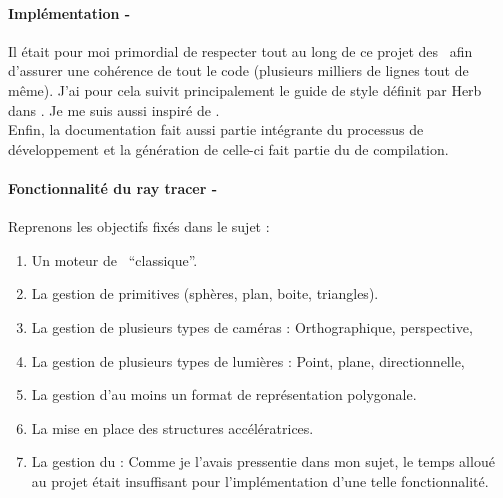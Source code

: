 \vspace*{1em}

\paragraph{Implémentation -} Il était pour moi primordial de respecter tout au
long de ce projet des \ afin d'assurer une cohérence de tout
le code (plusieurs milliers de lignes tout de même). J'ai pour cela suivit
principalement le guide de style définit par Herb  dans
\cite{Sutter05}. Je me suis aussi inspiré de \cite{Meyers94}.\\

Enfin, la documentation fait aussi partie intégrante du processus de
développement et la génération de celle-ci fait partie du  de
compilation.

\paragraph{Fonctionnalité du ray tracer -} Reprenons les objectifs fixés dans
le sujet :
\begin{enumerate}
  \item \tickmark{} Un moteur de \raytracing\ ``classique''.
  \item \tickmark{} La gestion de primitives (sphères, plan, boite,
    triangles).
  \item \tickmark{} La gestion de plusieurs types de caméras : Orthographique,
    perspective, \etc
  \item \tickmark{} La gestion de plusieurs types de lumières : Point, plane,
    directionnelle, \etc
  \item \tickmark{} La gestion d'au moins un format de représentation
    polygonale.
  \item \tickmark{} La mise en place des structures accélératrices.
  \item \tackmark{} La gestion du  : Comme je l'avais
    pressentie dans mon sujet, le temps alloué au projet était insuffisant
    pour l'implémentation d'une telle fonctionnalité.\\
\end{enumerate}

